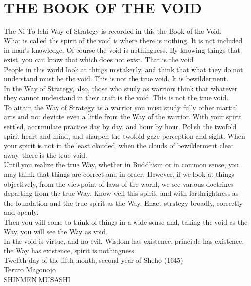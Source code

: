 \chapter{THE BOOK OF THE VOID}

The Ni To Ichi Way of Strategy is recorded in this the Book of the Void.\\

What is called the spirit of the void is where there is nothing. It is not included in man's knowledge. Of course the void is nothingness. By knowing things that exist, you can know that which does not exist. That is the void.\\

People in this world look at things mistakenly, and think that what they do not understand must be the void. This is not the true void. It is bewilderment.\\

In the Way of Strategy, also, those who study as warriors think that whatever they cannot understand in their craft is the void. This is not the true void.\\

To attain the Way of Strategy as a warrior you must study fully other martial arts and not deviate even a little from the Way of the warrior. With your spirit settled, accumulate practice day by day, and hour by hour. Polish the twofold spirit heart and mind, and sharpen the twofold gaze perception and sight. When your spirit is not in the least clouded, when the clouds of bewilderment clear away, there is the true void.\\

Until you realize the true Way, whether in Buddhism or in common sense, you may think that things are correct and in order. However, if we look at things objectively, from the viewpoint of laws of the world, we see various doctrines departing from the true Way. Know well this spirit, and with forthrightness as the foundation and the true spirit as the Way. Enact strategy broadly, correctly and openly.\\

Then you will come to think of things in a wide sense and, taking the void as the Way, you will see the Way as void.\\

In the void is virtue, and no evil. Wisdom has existence, principle has existence, the Way has existence, spirit is nothingness.\\

Twelfth day of the fifth month, second year of Shoho (1645)\\
Teruro Magonojo\\
SHINMEN MUSASHI
